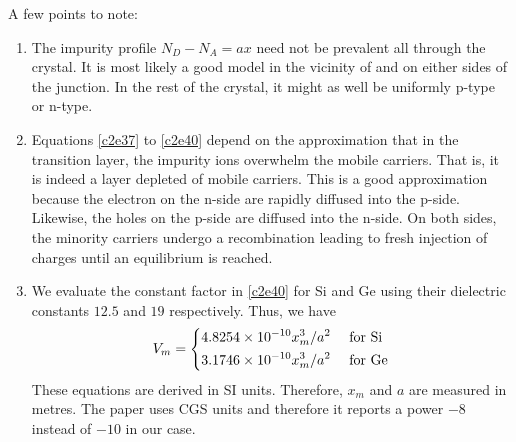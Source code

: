 A few points to note:
\begin{enumerate}
\item The impurity profile $N_D - N_A = ax$ need not be prevalent all through
the crystal. It is most likely a good model in the vicinity of and on either 
sides of the junction. In the rest of the crystal, it might as well be uniformly
p-type or n-type.
\item Equations \eqref{c2e37} to \eqref{c2e40} depend on the approximation that
in the transition layer, the impurity ions overwhelm the mobile carriers. That
is, it is indeed a layer depleted of mobile carriers. This is a good 
approximation because the electron on the n-side are rapidly diffused into the 
p-side. Likewise, the holes on the p-side are diffused into the n-side. On both
sides, the minority carriers undergo a recombination leading to fresh injection
of charges until an equilibrium is reached.
\item We evaluate the constant factor in \eqref{c2e40} for Si and Ge using their
dielectric constants $12.5$ and $19$ respectively. Thus, we have
\begin{equation}
V_m = \begin{dcases}
4.8254 \times 10^{-10} x_m^3/a^2 & \text{ for Si} \\
3.1746 \times 10^{-10} x_m^3/a^2 & \text{ for Ge}
\end{dcases}
\end{equation}
These equations are derived in SI units. Therefore, $x_m$ and $a$ are measured
in metres. The paper \cite{shockley1949theory} uses CGS units and therefore it
reports a power $-8$ instead of $-10$ in our case.
\end{enumerate}


